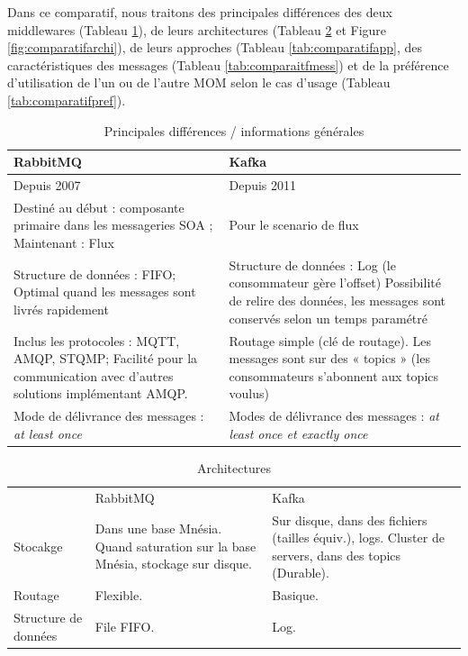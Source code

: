 \documentclass{article}
\begin{document}
			Dans ce comparatif, nous traitons des principales différences des deux middlewares (Tableau \ref{tab:comparatifinfos}), de leurs architectures (Tableau \ref{tab:comparatifarchi} et Figure \ref{fig:comparatifarchi}), de leurs approches (Tableau \ref{tab:comparatifapp}, des caractéristiques des messages (Tableau \ref{tab:comparaitfmess}) et de la préférence d'utilisation de l'un ou de l'autre MOM selon le cas d'usage (Tableau \ref{tab:comparatifpref}).\newline
			\begin{table}
				\begin{tabular}{|p{8cm}|p{8cm}|}
					\hline
					\rowcolor{lightgray} RabbitMQ & Kafka\\\hline
					Depuis 2007 & Depuis 2011\\\hline
					Destiné au début : composante primaire dans les messageries SOA ; Maintenant : Flux & Pour le scenario de flux\\\hline
					Structure de données : FIFO; Optimal quand les messages sont livrés rapidement & Structure de données : Log (le consommateur gère l’offset) Possibilité de relire des données, les messages sont conservés selon un temps paramétré\\\hline
					Inclus les protocoles : MQTT, AMQP, STQMP; Facilité pour la communication avec d’autres solutions implémentant AMQP. & Routage simple (clé de routage). Les messages sont sur des « topics » (les consommateurs s’abonnent aux topics voulus)\\\hline
					Mode de délivrance des messages : \textit{at least once} & Modes de délivrance des messages : \textit{at least once et exactly once}\\\hline
				\end{tabular}
				\caption{Principales différences / informations générales}
				\label{tab:comparatifinfos}
			\end{table}
			\medskip
			\begin{table}
				\begin{tabular}{|p{4cm}|p{6cm}|p{6cm}|}
					\rowcolor{lightgray} & RabbitMQ & Kafka\\
					Stocakge & Dans une base Mnésia. Quand saturation sur la base Mnésia, stockage sur disque. & Sur disque, dans des fichiers (tailles équiv.), logs. Cluster de servers, dans des topics (Durable). \\\hline
					Routage & Flexible. & Basique.\\\hline
					Structure de données & File FIFO. & Log.\\\hline
				\end{tabular}
				\caption{Architectures}
				\label{tab:comparatifarchi}
			\end{table}
\end{document}
